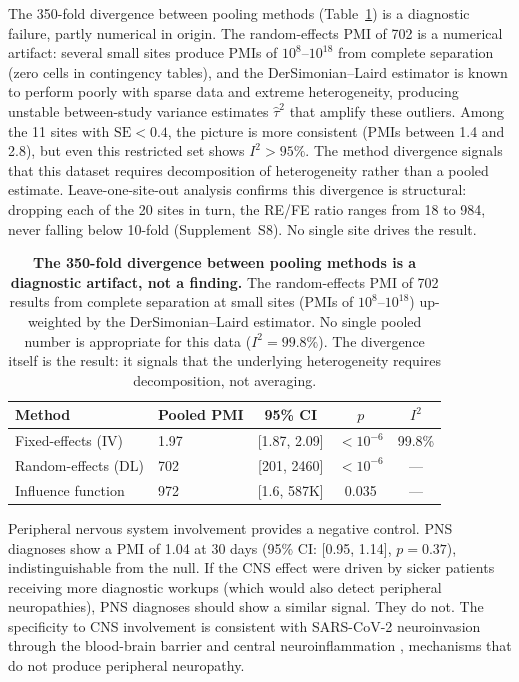 \documentclass[11pt]{article}
\begin{document}
The 350-fold divergence between pooling methods (Table~\ref{tab:meta}) is a
diagnostic failure, partly numerical in origin.  The random-effects PMI of
702 is a numerical artifact: several small sites produce PMIs of
$10^{8}$--$10^{18}$ from complete separation (zero cells in contingency
tables), and the DerSimonian--Laird estimator is known to perform poorly
with sparse data and extreme heterogeneity, producing unstable
between-study variance estimates $\hat\tau^2$ that amplify these outliers.  Among the 11 sites with $\text{SE} < 0.4$, the picture is more
consistent (PMIs between 1.4 and 2.8), but even this restricted set shows
$I^2 > 95\%$.  The method divergence signals that this dataset requires
decomposition of heterogeneity rather than a pooled estimate.
Leave-one-site-out analysis confirms this divergence is structural:
dropping each of the 20 sites in turn, the RE/FE ratio ranges from
18 to 984, never falling below 10-fold (Supplement~S8).  No single
site drives the result.

\begin{table}[t]
\centering
\caption{\textbf{The 350-fold divergence between pooling methods is a
diagnostic artifact, not a finding.}  The random-effects PMI of 702 results
from complete separation at small sites (PMIs of $10^{8}$--$10^{18}$)
up-weighted by the DerSimonian--Laird estimator.  No single pooled number
is appropriate for this data ($I^2 = 99.8\%$).  The divergence itself is
the result: it signals that the underlying heterogeneity requires
decomposition, not averaging.}
\label{tab:meta}
\begin{tabular}{llccc}
\toprule
Method & Pooled PMI & 95\% CI & $p$ & $I^2$ \\
\midrule
Fixed-effects (IV) & 1.97 & [1.87, 2.09] & $< 10^{-6}$ & 99.8\% \\
Random-effects (DL) & 702 & [201, 2460] & $< 10^{-6}$ & --- \\
Influence function & 972 & [1.6, 587K] & 0.035 & --- \\
\bottomrule
\end{tabular}
\end{table}

Peripheral nervous system involvement provides a negative control.  PNS
diagnoses show a PMI of 1.04 at 30 days (95\% CI: [0.95, 1.14],
$p = 0.37$), indistinguishable from the null.  If the CNS effect were
driven by sicker patients receiving more diagnostic workups (which would
also detect peripheral neuropathies), PNS diagnoses should show a similar
signal.  They do not.  The specificity to CNS involvement is consistent
with SARS-CoV-2 neuroinvasion through the blood-brain barrier
\cite{song2021neuroinvasion} and central neuroinflammation
\cite{iadecola2020covid}, mechanisms that do not produce peripheral
neuropathy.
\end{document}
